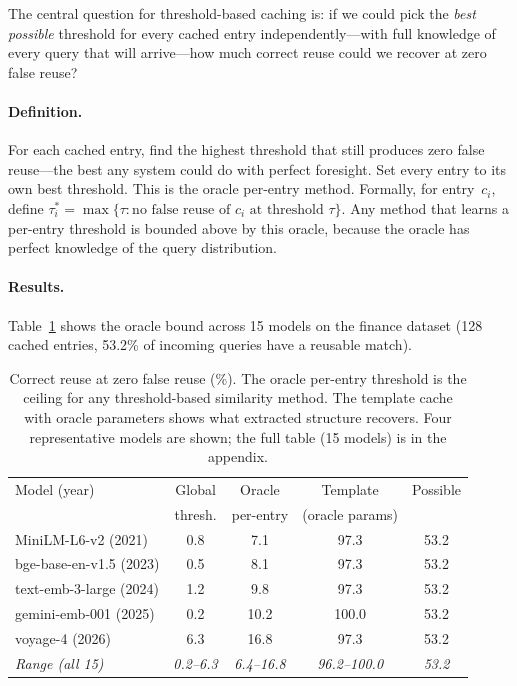 \documentclass[11pt,a4paper]{article}
\begin{document}
The central question for threshold-based caching is: if we could pick the
\emph{best possible} threshold for every cached entry independently---with
full knowledge of every query that will arrive---how much correct reuse
could we recover at zero false reuse?

\paragraph{Definition.} For each cached entry, find the highest
threshold that still produces zero false reuse---the best any system
could do with perfect foresight. Set every entry to its own best
threshold. This is the oracle per-entry method.
Formally, for entry~$c_i$, define
$\tau^*_i = \max\{\tau : \text{no false reuse of } c_i \text{ at threshold } \tau\}$.
Any method that learns a per-entry threshold \cite{schroeder2026vcache}
is bounded above by this oracle, because the oracle has perfect knowledge
of the query distribution.

\paragraph{Results.} Table~\ref{tab:oracle} shows the oracle bound across
15 models on the finance dataset (128 cached entries, 53.2\% of incoming
queries have a reusable match).

\begin{table}[t]
\centering
\caption{Correct reuse at zero false reuse (\%). The oracle per-entry
threshold is the ceiling for any threshold-based similarity method. The
template cache with oracle parameters shows what extracted structure
recovers. Four representative models are shown; the full table (15 models)
is in the appendix.}
\label{tab:oracle}
\small
\begin{tabular}{@{}lcccc@{}}
\toprule
Model (year) & Global & Oracle & Template & Possible \\
             & thresh. & per-entry & (oracle params) & \\
\midrule
MiniLM-L6-v2 (2021)     &  0.8 &  7.1 & 97.3 & 53.2 \\
bge-base-en-v1.5 (2023)    &  0.5 &  8.1 & 97.3 & 53.2 \\
text-emb-3-large (2024)  &  1.2 &  9.8 & 97.3 & 53.2 \\
gemini-emb-001 (2025)    &  0.2 & 10.2 & 100.0 & 53.2 \\
voyage-4 (2026)          &  6.3 & 16.8 & 97.3 & 53.2 \\
\midrule
\textit{Range (all 15)}  & \textit{0.2--6.3} & \textit{6.4--16.8}
                          & \textit{96.2--100.0} & \textit{53.2} \\
\bottomrule
\end{tabular}
\end{table}
\end{document}
